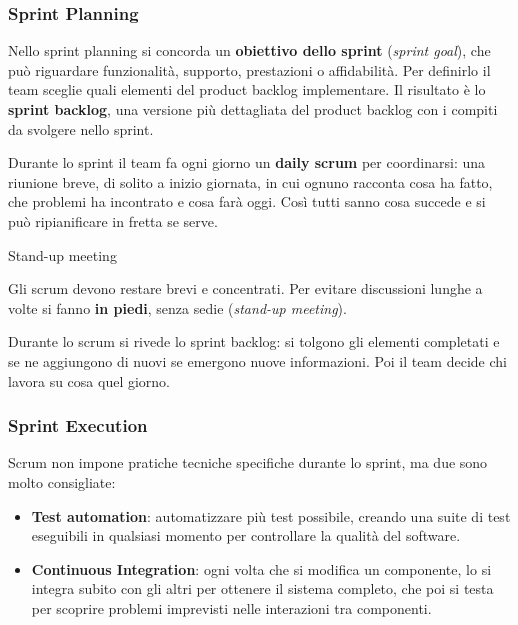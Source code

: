 \subsubsection{Sprint Planning}\label{sprint-planning}

Nello sprint planning si concorda un \textbf{obiettivo dello sprint}
(\emph{sprint goal}), che può riguardare funzionalità, supporto,
prestazioni o affidabilità. Per definirlo il team sceglie quali elementi
del product backlog implementare. Il risultato è lo \textbf{sprint
backlog}, una versione più dettagliata del product backlog con i compiti
da svolgere nello sprint.

Durante lo sprint il team fa ogni giorno un \textbf{daily scrum} per
coordinarsi: una riunione breve, di solito a inizio giornata, in cui
ognuno racconta cosa ha fatto, che problemi ha incontrato e cosa farà
oggi. Così tutti sanno cosa succede e si può ripianificare in fretta se
serve.

\begin{boxtip}{Stand-up meeting}

Gli scrum devono restare brevi e concentrati. Per evitare discussioni
lunghe a volte si fanno \textbf{in piedi}, senza sedie (\emph{stand-up
meeting}).

\end{boxtip}

Durante lo scrum si rivede lo sprint backlog: si tolgono gli elementi
completati e se ne aggiungono di nuovi se emergono nuove informazioni.
Poi il team decide chi lavora su cosa quel giorno.

\subsubsection{Sprint Execution}\label{sprint-execution}

Scrum non impone pratiche tecniche specifiche durante lo sprint, ma due
sono molto consigliate:

\begin{itemize}
\tightlist
\item
  \textbf{Test automation}: automatizzare più test possibile, creando
  una suite di test eseguibili in qualsiasi momento per controllare la
  qualità del software.
\item
  \textbf{Continuous Integration}: ogni volta che si modifica un
  componente, lo si integra subito con gli altri per ottenere il sistema
  completo, che poi si testa per scoprire problemi imprevisti nelle
  interazioni tra componenti.
\end{itemize}

